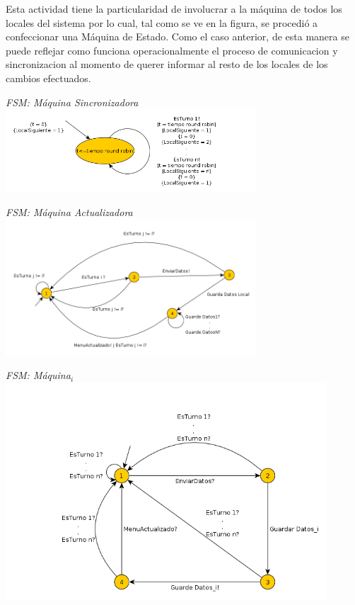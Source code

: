 \documentclass[a4paper,11pt] {article}
\begin{document}
Esta actividad tiene la particularidad de involucrar a la m\'aquina de todos los locales del sistema por lo cual, tal como se ve en la figura, se procedi\'o a confeccionar una M\'aquina de Estado. Como el caso anterior, de esta manera se puede reflejar como funciona operacionalmente el proceso de comunicacion y sincronizacion al momento de querer informar al resto de los locales de los cambios efectuados.


\begin{center}
 \textit{FSM: M\'aquina Sincronizadora}
 \includegraphics[width=0.7\textwidth]{Diagramas/FSMSincronizador.png}
\end{center}




\begin{center}
 \textit{FSM: M\'aquina Actualizadora}
 \includegraphics[width=0.7\textwidth]{Diagramas/FSMActualizacionActualizadora.png}
\end{center}

\begin{center}
 \textit{FSM: M\'aquina$_{i}$}
 \includegraphics[width=0.9\textwidth]{Diagramas/FSMActualizacionMaquinai.png}
\end{center}
\end{document}
